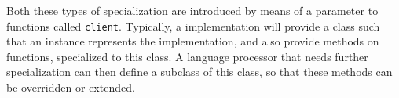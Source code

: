 Both these types of specialization are introduced by means of a
parameter to \sysname{} functions called \texttt{client}.  Typically,
a \commonlisp{} implementation will provide a class such that an
instance represents the implementation, and also provide methods on
\sysname{} functions, specialized to this class.  A language processor
that needs further specialization can then define a subclass of this
class, so that these methods can be overridden or extended.
